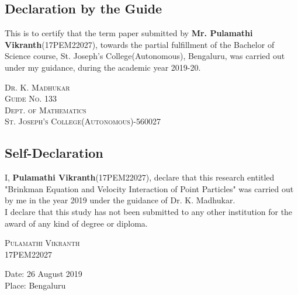 \documentclass[12pt]{article}
\begin{document}
\cleardoublepage

\begin{center}
\section*{Declaration by the Guide}
\end{center}


\begin{center}
\vspace{40mm}
This is to certify that the term paper submitted by \textbf{Mr. Pulamathi Vikranth}(17PEM22027), towards the partial fulfillment of the Bachelor of Science course, St. Joseph's College(Autonomous), Bengaluru, was carried out under my guidance, during the academic year 2019-20.\\


\end{center}
\vspace{60mm}
\begin{flushright}
\textsc{Dr. K. Madhukar\\Guide No. 133\\ Dept. of Mathematics\\ St. Joseph's College(Autonomous)-560027}
\end{flushright}




\cleardoublepage

\begin{center}
\section*{Self-Declaration}
\end{center}


\begin{center}
\vspace{30mm}
I, \textbf{Pulamathi Vikranth}(17PEM22027), declare that this research entitled "Brinkman Equation and Velocity Interaction of Point Particles" was carried out by me in the year 2019 under the guidance of Dr. K. Madhukar.\\
\vspace{15mm}
I declare that this study has not been submitted to any other institution for the award of any kind of degree or diploma. 

\end{center}
\vspace{50mm}
\begin{flushright}
\textsc{Pulamathi Vikranth\\17PEM22027}
\end{flushright}
\vspace{20mm}
\begin{flushleft}
Date: 26 August 2019\\
Place: Bengaluru
\end{flushleft}
\end{document}
